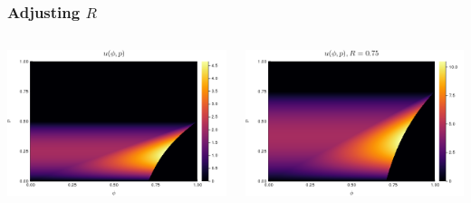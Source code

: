 \documentclass{beamer}
\begin{document}
\begin{frame}
    \frametitle{Adjusting $R$}
    \begin{columns}
        \hspace{-1 cm}\begin{column}{0.5\textwidth}
            \includegraphics[scale=0.3]{vanilla.png}
        \end{column}
        \begin{column}{0.5\textwidth}
            \includegraphics[scale=0.3]{high_R.png}
        \end{column}
    \end{columns}
\end{frame}
\end{document}
